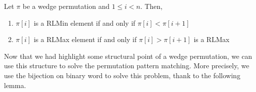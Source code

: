 \documentclass[a4paper]{llncs}
\newcounter{num}
\begin{document}
\begin{corollary}
\label{corollary:max is ascent}
Let $\pi$ be a wedge permutation and $1 \leq i < n$. Then,
\begin{enumerate}
\item $\pi[i]$ is a RLMin element if and only if $\pi[i]<\pi[i+1]$
\item $\pi[i]$ is a RLMax element if and only if $\pi[i]>\pi[i+1]$ is a RLMax
\end{enumerate}

\end{corollary}




%
%
%
%
%

Now that we had highlight some structural point of a wedge permutation,
we can use this structure to solve the permutation pattern matching.
More precisely, we use the bijection on binary word to solve this problem,
thank to the following lemma.
\end{document}
